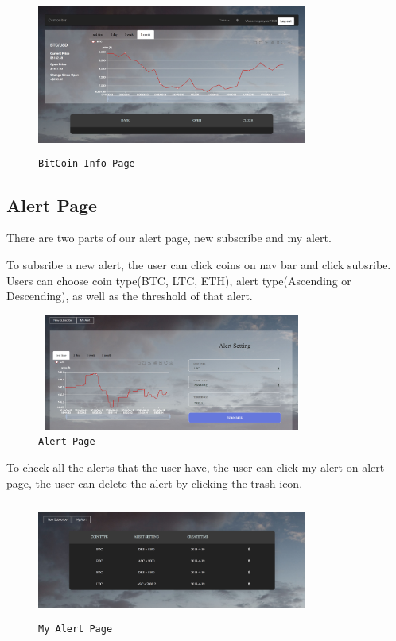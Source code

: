 \begin{figure}[!htb]
\includegraphics[height=2.0in, width=3.5in]{coinpage.jpg}
\caption{\texttt{BitCoin Info Page}}
\end{figure}

\subsection{Alert Page}
There are two parts of our alert page, new subscribe and my alert.

To subsribe a new alert, the user can click coins on nav bar and click subsribe. Users
can choose coin type(BTC, LTC, ETH), alert type(Ascending or Descending), as well as the 
threshold of that alert.

\begin{figure}[!htb]
\includegraphics[height=1.5in, width=3.5in]{alert.jpg}
\caption{\texttt{Alert Page}}
\end{figure}


To check all the alerts that the user have, the user can click my alert on alert page,
the user can delete the alert by clicking the trash icon.

\begin{figure}[!htb]
\includegraphics[height=1.5in, width=3.5in]{myalert.jpg}
\caption{\texttt{My Alert Page}}
\end{figure}

